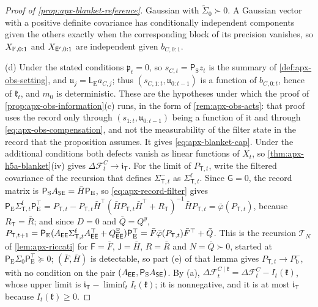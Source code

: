 \begin{proof}[Proof of \cref{prop:apx-blanket-reference}]
Gaussian with $\tilde\Sigma_0\succ0$. A Gaussian vector with a positive definite covariance has conditionally independent components given the others exactly when the corresponding block of its precision vanishes, so $X_{\mathsf{I}',0:1}$ and $X_{\mathsf{E}',0:1}$ are independent given $b_{C,0:1}$.

(d) Under the stated conditions $\mathfrak p_t=0$, so $s_{C,t}=\mathsf P_{\mathrm S}z_t$ is the summary of \cref{def:apx-obs-setting}, and $\mathfrak u_j=\mathsf L_{\mathrm E}a_{C,j}$; thus $(s_{C,1:t},\mathfrak u_{0:t-1})$ is a function of $b_{C,0:t}$, hence of $\mathfrak k_t$, and $m_0$ is deterministic. These are the hypotheses under which the proof of \cref{prop:apx-obs-information}(c) runs, in the form of \cref{rem:apx-obs-acts}: that proof uses the record only through $(s_{1:t},\mathfrak u_{0:t-1})$ being a function of it and through \eqref{eq:apx-obs-compensation}, and not the measurability of the filter state in the record that the proposition assumes. It gives \eqref{eq:apx-blanket-cap}. Under the additional conditions both defects vanish as linear functions of $X_t$, so \cref{thm:apx-h5a-blanket}(iv) gives $\Delta\mathcal F^C_t\to\mathfrak i_{\mathsf T}$. For the limit of $P_{\mathsf T,t}$, write the filtered covariance of the recursion that defines $\Sigma^-_{\mathsf T,t}$ as $\Sigma^{\mathrm f}_{\mathsf T,t}$. Since $\mathsf G=0$, the record matrix is $\mathsf P_{\mathrm S}A_{\mathsf{S}\mathsf{E}}=\bar H\mathsf P_{\mathrm E}$, so \eqref{eq:apx-record-filter} gives $\mathsf P_{\mathrm E}\Sigma^{\mathrm f}_{\mathsf T,t}\mathsf P_{\mathrm E}^\top=P_{\mathsf T,t}-P_{\mathsf T,t}\bar H^\top(\bar HP_{\mathsf T,t}\bar H^\top+R_{\mathsf T})^{-1}\bar HP_{\mathsf T,t}=\bar\varphi(P_{\mathsf T,t})$, because $R_{\mathsf T}=\bar R$; and since $D=0$ and $\bar Q=Q^y$, $P_{\mathsf T,t+1}=\mathsf P_{\mathrm E}(A_{\mathsf{E}\mathsf{E}}\Sigma^{\mathrm f}_{\mathsf T,t}A_{\mathsf{E}\mathsf{E}}^\top+Q^{\Xi}_{\mathsf{E}\mathsf{E}})\mathsf P_{\mathrm E}^\top=\bar F\bar\varphi(P_{\mathsf T,t})\bar F^\top+\bar Q$. This is the recursion $\mathcal T_N$ of \cref{lem:apx-riccati} for $\mathsf F=\bar F$, $\mathsf J=\bar H$, $R=\bar R$ and $N=\bar Q\succ0$, started at $\mathsf P_{\mathrm E}\Sigma_0\mathsf P_{\mathrm E}^\top\succeq0$; $(\bar F,\bar H)$ is detectable, so part (e) of that lemma gives $P_{\mathsf T,t}\to P^-_{\mathrm b}$, with no condition on the pair $(A_{\mathsf{E}\mathsf{E}},\mathsf P_{\mathrm S}A_{\mathsf{S}\mathsf{E}})$. By (a), $\Delta\mathcal F^{C\mid\mathfrak k}_t=\Delta\mathcal F^C_t-I_t(\mathfrak k)$, whose upper limit is $\mathfrak i_{\mathsf T}-\liminf_tI_t(\mathfrak k)$; it is nonnegative, and it is at most $\mathfrak i_{\mathsf T}$ because $I_t(\mathfrak k)\ge0$.
\end{proof}

